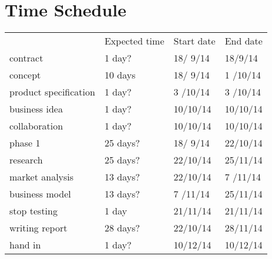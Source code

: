 \documentclass[a4paper,10pt]{article}
\begin{document}
\section{Time Schedule}

\begin{tabular}{llll}
& Expected time & Start date & End date \\
contract		& 1 day?	& 18/ 9/14	& 18/9/14   \\
concept			& 10 days	& 18/ 9/14	& 1 /10/14  \\
product specification	& 1 day?	& 3 /10/14	& 3 /10/14  \\
business idea		& 1 day?	& 10/10/14	& 10/10/14 \\
collaboration		& 1 day?	& 10/10/14	& 10/10/14 \\
phase 1			& 25 days?	& 18/ 9/14	& 22/10/14 \\[5pt]
research		& 25 days?	& 22/10/14	& 25/11/14 \\
market analysis		& 13 days?	& 22/10/14	& 7 /11/14   \\
business model		& 13 days?	& 7 /11/14	& 25/11/14 \\
stop testing		& 1 day		& 21/11/14	& 21/11/14 \\[5pt]
writing report		& 28 days?	& 22/10/14	& 28/11/14 \\
hand in			& 1 day?	& 10/12/14	& 10/12/14 \\
\end{tabular}
\end{document}
